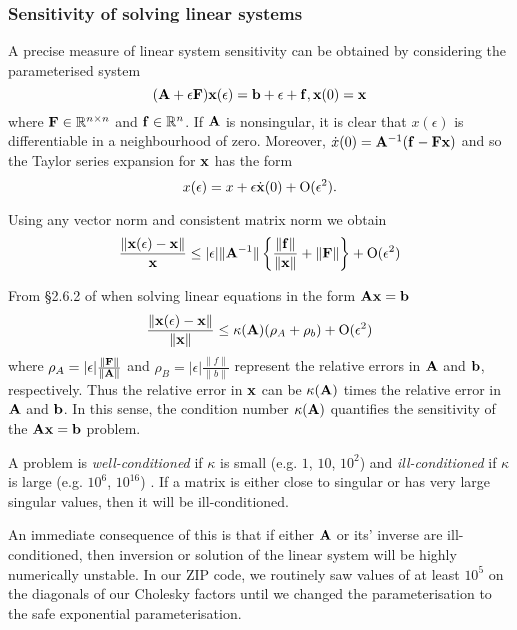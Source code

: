 \documentclass{amsart}[12pt]
\begin{document}
\subsubsection{Sensitivity of solving linear systems}

A precise measure of linear system sensitivity can be obtained by considering the parameterised system
\[
	({\bf A} + \epsilon {\bf F}) {\bf x}(\epsilon) = {\bf b} + \epsilon + {\bf f},  {\bf x}(0) = {\bf x}
\]
where ${\bf F} \in {\mathbb{R}}^{n \times n}$ and ${\bf f} \in {\mathbb{R}}^n$. If ${\bf A}$ is nonsingular, it is clear that $x(\epsilon)$ is
differentiable in a neighbourhood of zero. Moreover, $\dot{x}(0) = {\bf A}^{-1} ({\bf f} - {\bf F} {\bf x})$ and so the
Taylor series expansion for ${\bf x}$ has the form
\[
	x(\epsilon) = x + \epsilon \dot{{\bf x}}(0) + \text{O}(\epsilon^2).
\]

Using any vector norm and consistent matrix norm we obtain
\[
	\frac{\|{\bf x}(\epsilon) - {\bf x}\|}{{\bf x}} \leq |\epsilon| \|{\bf A}^{-1}\| \left\{\frac{\|{\bf f}\|}{\|{\bf x}\|} + \|{\bf F}\|\right\} + \text{O}(\epsilon^2)
\]

From \S 2.6.2 of \citep{Golub:1996:MC:248979}
when solving linear equations in the form ${\bf A} {\bf x} = {\bf b}$
\[
	\frac{\|{\bf x}(\epsilon) - {\bf x}\|}{\|{\bf x}\|} \leq \kappa({\bf A}) (\rho_A + \rho_b) + \text{O}(\epsilon^2)
\]
where $\rho_A = |\epsilon| \frac{\|{\bf F}\|}{\|{\bf A}\|}$ and $\rho_B = |\epsilon| \frac{\|f\|}{\|b\|}$ represent
the relative errors in ${\bf A}$ and ${\bf b}$, respectively. Thus the relative error in ${\bf x}$ can be $\kappa({\bf A})$
times the relative error in ${\bf A}$ and ${\bf b}$. In this sense, the condition number $\kappa({\bf A})$ quantifies the
sensitivity of the ${\bf A} {\bf x} = {\bf b}$ problem.


A problem is \emph{well-conditioned} if $\kappa$ is small (e.g. $1$, $10$, $10^2$) and \emph{ill-conditioned}
if $\kappa$ is large (e.g. $10^6$, $10^{16}$) \cite{trefethen97}.  If a matrix is either close to singular or
has very large singular values, then it will be ill-conditioned.

An immediate consequence of this is that if either ${\bf A}$ or its' inverse are ill-conditioned, then inversion
or solution of the linear system will be highly numerically unstable. In our ZIP code, we routinely saw values of 
at least $10^5$ on the diagonals of our Cholesky factors until we changed the parameterisation to the safe
exponential parameterisation.
\end{document}
